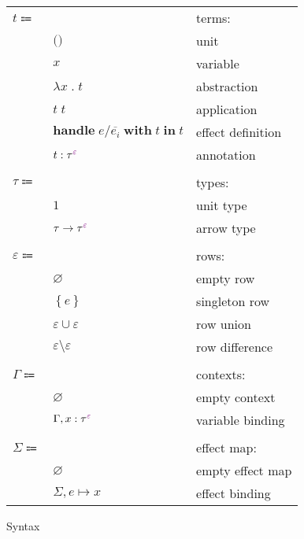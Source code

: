 \documentclass[12pt]{article}
\newcommand\anno[2]{#1 : #2}
\newcommand\term{t}
\newcommand\eUnit{\texttt{()}}
\newcommand\eVar{x}
\newcommand\eAbs[2]{\lambda #1 \; . \; #2}
\newcommand\eApp[2]{#1 \; #2}
\newcommand\eHandle[4]{\textbf{handle} \; #1 / #2 \; \textbf{with} \; #3 \; \textbf{in} \; #4}
\newcommand\eAnno[3]{\anno{#1}{\tEmbellished{#2}{#3}}}
\newcommand\type{\tau}
\newcommand\tUnit{1}
\newcommand\tArrow[3]{#1 \rightarrow \tEmbellished{#2}{#3}}
\newcommand\tEmbellished[2]{{#1}^{\textcolor{violet}{#2}}}
\newcommand\row{\varepsilon}
\newcommand\rEmpty{\varnothing}
\newcommand\rSingleton[1]{\left\{ #1 \right\}}
\newcommand\rUnion[2]{#1 \cup #2}
\newcommand\rDiff[2]{#1 \setminus #2}
\newcommand\context{\Gamma}
\newcommand\cEmpty{\varnothing}
\newcommand\cExtend[4]{#1, \anno{#2}{\tEmbellished{#3}{#4}}}
\newcommand\effect{e}
\newcommand\effectMap{\Sigma}
\newcommand\emMap[2]{#1 \mapsto #2}
\newcommand\emEmpty{\varnothing}
\newcommand\emExtend[3]{#1, \emMap{#2}{#3}}
\begin{document}
      \begin{figure}[H]
        \begin{mdframed}[backgroundcolor=none]
          \begin{center}
            \begin{tabular}{l l l}
              $\term \Coloneqq $ & & terms: \\
              & $\eUnit$ & unit \\
              & $\eVar$ & variable \\
              & $\eAbs{\eVar}{\term}$ & abstraction \\
              & $\eApp{\term}{\term}$ & application \\
              & $\eHandle{\effect}{\overline{\effect_i}}{\term}{\term}$ & effect definition \\
              & $\eAnno{\term}{\type}{\row}$ & annotation \\
              \\
              $\type \Coloneqq$ & & types: \\
              & $\tUnit$ & unit type \\
              & $\tArrow{\type}{\type}{\row}$ & arrow type \\
              \\
              $\row \Coloneqq$ & & rows: \\
              & $\rEmpty$ & empty row \\
              & $\rSingleton{\effect}$ & singleton row \\
              & $\rUnion{\row}{\row}$ & row union \\
              & $\rDiff{\row}{\row}$ & row difference \\
              \\
              $\context \Coloneqq$ & & contexts: \\
              & $\cEmpty$ & empty context \\
              & $\cExtend{\context}{\eVar}{\type}{\row}$ & variable binding \\
              \\
              $\effectMap \Coloneqq$ & & effect map: \\
              & $\emEmpty$ & empty effect map \\
              & $\emExtend{\effectMap}{\effect}{\eVar}$ & effect binding \\
            \end{tabular}
          \end{center}

          \caption{Syntax}\label{fig:syntax}
        \end{mdframed}
      \end{figure}
\end{document}
